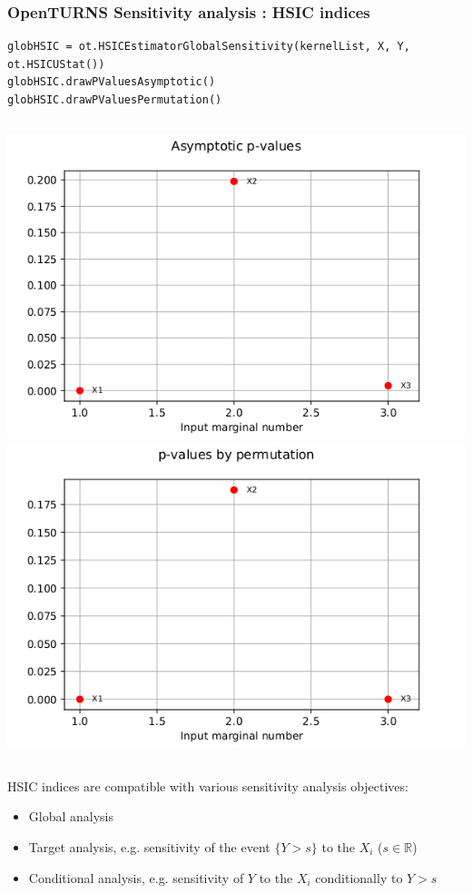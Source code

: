 \documentclass{beamer}
\begin{document}
\begin{frame}[containsverbatim]
\frametitle{OpenTURNS Sensitivity analysis : HSIC indices}

\begin{lstlisting}
globHSIC = ot.HSICEstimatorGlobalSensitivity(kernelList, X, Y, ot.HSICUStat())
globHSIC.drawPValuesAsymptotic()
globHSIC.drawPValuesPermutation()
\end{lstlisting}


\begin{columns}
  \includegraphics[width=.99\textwidth]{figures/HSIC_Pvalues_asymptotic.png}
  \includegraphics[width=.99\textwidth]{figures/HSIC_Pvalues_permutation.png}
\end{columns}

\medskip

\small 
HSIC indices are compatible with various sensitivity analysis objectives:

\begin{itemize}
  \item Global analysis
  \item Target analysis, e.g. sensitivity of the event $\{Y>s\}$ to the $X_i$ ($s \in \mathbb{R}$)
  \item Conditional analysis, e.g. sensitivity of $Y$ to the $X_i$ conditionally to $Y>s$
\end{itemize}
  
\end{frame}
  
\end{document}
